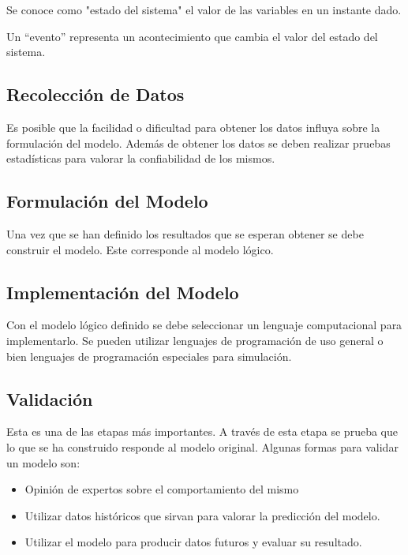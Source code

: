 Se conoce como "estado del sistema" el valor de las variables en un instante dado.

Un ``evento'' representa un acontecimiento que cambia el valor del estado del sistema.


\subsection{Recolección de Datos}


Es posible que la facilidad o dificultad para obtener los datos influya sobre la formulación del modelo. Además de obtener los datos se deben realizar pruebas estadísticas para valorar la confiabilidad de los mismos.


\subsection{Formulación del Modelo}

Una vez que se han definido los resultados que se esperan obtener se debe construir el modelo. Este corresponde al modelo lógico. 


\subsection{Implementación del Modelo}

Con el modelo lógico definido se debe seleccionar un lenguaje computacional para implementarlo. Se pueden utilizar lenguajes de programación de uso general o bien lenguajes de programación especiales para simulación.


\subsection{Validación}


Esta es una de las etapas más importantes. A través de esta etapa se prueba que lo que se ha construido responde al modelo original. Algunas formas para validar un modelo son:
\begin{itemize}
\item Opinión de expertos sobre el comportamiento del mismo

\item Utilizar datos históricos que sirvan para valorar la predicción del modelo.

\item Utilizar el modelo para producir datos futuros y evaluar su resultado.
\end{itemize}

